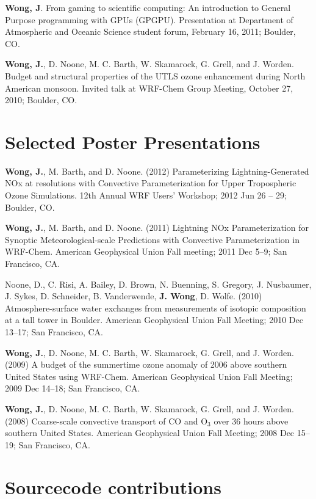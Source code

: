 \documentclass[overlap,12pt,centered]{res}
\begin{document}
\begin{resume}
		\textbf{Wong, J}. From gaming to scientific computing: An introduction to General Purpose programming with GPUs (GPGPU). Presentation at Department of Atmospheric and Oceanic Science student forum, February 16, 2011; Boulder, CO.
		
		\textbf{Wong, J.}, D. Noone, M. C. Barth, W. Skamarock, G. Grell, and J. Worden. Budget and structural properties of the UTLS ozone enhancement during North American monsoon. Invited talk at WRF-Chem Group Meeting, October 27, 2010; Boulder, CO.
		
		
		\section{ \sc Selected Poster Presentations}
		
		\textbf{Wong, J.}, M. Barth, and D. Noone. (2012) Parameterizing Lightning-Generated NOx at resolutions with Convective Parameterization for Upper Tropospheric Ozone Simulations. 12th Annual WRF Users' Workshop; 2012 Jun 26 -- 29; Boulder, CO.
		
		\textbf{Wong, J.}, M. Barth, and D. Noone. (2011) Lightning NOx Parameterization for Synoptic Meteorological-scale Predictions with Convective Parameterization in WRF-Chem. American Geophysical Union Fall meeting; 2011 Dec 5--9; San Francisco, CA.
		
		Noone, D., C. Risi, A. Bailey, D. Brown, N. Buenning, S. Gregory, J. Nusbaumer, J. Sykes, D. Schneider, B. Vanderwende, \textbf{J. Wong}, D. Wolfe. (2010) Atmosphere-surface water exchanges from measurements of isotopic composition at a tall tower in Boulder. American Geophysical Union Fall Meeting; 2010 Dec 13--17; San Francisco, CA.
		
		\textbf{Wong, J.}, D. Noone, M. C. Barth, W. Skamarock, G. Grell, and J. Worden. (2009) A budget of the summertime ozone anomaly of 2006 above southern United States using WRF-Chem. American Geophysical Union Fall Meeting; 2009 Dec 14--18; San Francisco, CA.
		
		\textbf{Wong, J.}, D. Noone, M. C. Barth, W. Skamarock, G. Grell, and J. Worden. (2008) Coarse-scale convective transport of CO and O$_3$ over 36 hours above southern United States. American Geophysical Union Fall Meeting; 2008 Dec 15--19; San Francisco, CA.
		
		\section{\sc Sourcecode contributions}
		

\end{resume}
\end{document}
